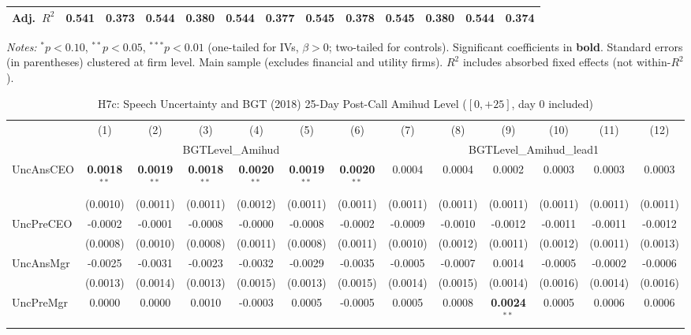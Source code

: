 \documentclass[11pt,a4paper]{article}
\begin{document}
\begin{table}[htbp]
\begin{tabular}{lcccccccccccc}
Adj.~$R^2$ & 0.541 & 0.373 & 0.544 & 0.380 & 0.544 & 0.377 & 0.545 & 0.378 & 0.545 & 0.380 & 0.544 & 0.374 \\
\bottomrule
\end{tabular}
\begin{minipage}{\linewidth}
\vspace{2pt}\scriptsize
\textit{Notes:} $^{*}p<0.10$, $^{**}p<0.05$, $^{***}p<0.01$ (one-tailed for IVs, $\beta > 0$; two-tailed for controls).
 Significant coefficients in \textbf{bold}.
 Standard errors (in parentheses) clustered at firm level.
 Main sample (excludes financial and utility firms).
 $R^2$ includes absorbed fixed effects (not within-$R^2$).
\end{minipage}
\end{table}
\clearpage
\begin{table}[htbp]
\centering
\caption{H7c: Speech Uncertainty and BGT (2018) 25-Day Post-Call Amihud Level ($[0,+25]$, day 0 included)}
\label{tab:h7c}
\scriptsize
\begin{tabular}{lcccccccccccc}
\toprule
 & (1) & (2) & (3) & (4) & (5) & (6) & (7) & (8) & (9) & (10) & (11) & (12) \\
 & \multicolumn{6}{c}{BGTLevel\_Amihud} & \multicolumn{6}{c}{BGTLevel\_Amihud\_lead1} \\
\cmidrule(lr){2-7} \cmidrule(lr){8-13}
\midrule
UncAnsCEO & \textbf{0.0018}$^{**}$ & \textbf{0.0019}$^{**}$ & \textbf{0.0018}$^{**}$ & \textbf{0.0020}$^{**}$ & \textbf{0.0019}$^{**}$ & \textbf{0.0020}$^{**}$ & 0.0004 & 0.0004 & 0.0002 & 0.0003 & 0.0003 & 0.0003 \\
 & (0.0010) & (0.0011) & (0.0011) & (0.0012) & (0.0011) & (0.0011) & (0.0011) & (0.0011) & (0.0011) & (0.0011) & (0.0011) & (0.0011) \\
UncPreCEO & -0.0002 & -0.0001 & -0.0008 & -0.0000 & -0.0008 & -0.0002 & -0.0009 & -0.0010 & -0.0012 & -0.0011 & -0.0011 & -0.0012 \\
 & (0.0008) & (0.0010) & (0.0008) & (0.0011) & (0.0008) & (0.0011) & (0.0010) & (0.0012) & (0.0011) & (0.0012) & (0.0011) & (0.0013) \\
UncAnsMgr & -0.0025 & -0.0031 & -0.0023 & -0.0032 & -0.0029 & -0.0035 & -0.0005 & -0.0007 & 0.0014 & -0.0005 & -0.0002 & -0.0006 \\
 & (0.0013) & (0.0014) & (0.0013) & (0.0015) & (0.0013) & (0.0015) & (0.0014) & (0.0015) & (0.0014) & (0.0016) & (0.0014) & (0.0016) \\
UncPreMgr & 0.0000 & 0.0000 & 0.0010 & -0.0003 & 0.0005 & -0.0005 & 0.0005 & 0.0008 & \textbf{0.0024}$^{**}$ & 0.0005 & 0.0006 & 0.0006 \\

\end{tabular}
\end{table}
\end{document}
